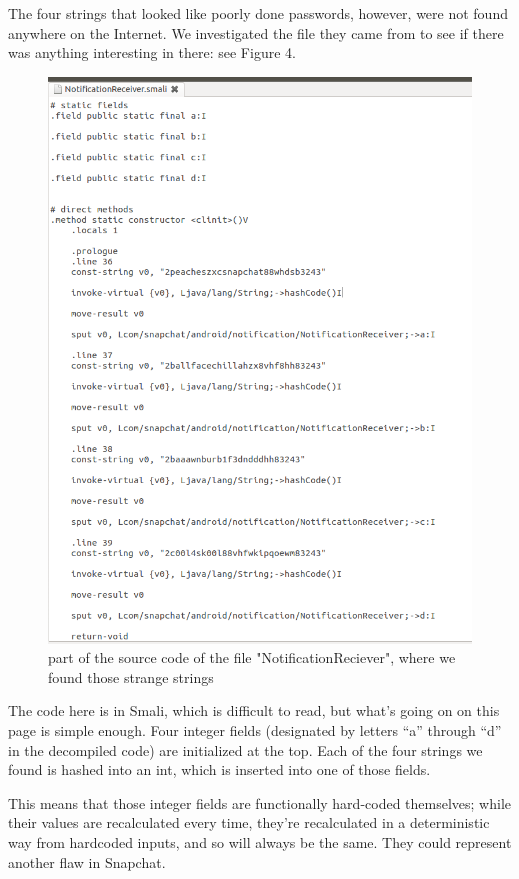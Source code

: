 \documentclass[11pt]{article}
\numberwithin{theorem}{subsection}
\begin{document}
The four strings that looked like poorly done passwords, however, were not found anywhere on the Internet.  We investigated the file
they came from to see if there was anything interesting in there: see Figure 4.

\begin{figure}[H]
  \caption{part of the source code of the file "NotificationReciever", where we found those strange strings}
  \centering
  \includegraphics[scale=0.6]{image4.png}
\end{figure}

The code here is in Smali, which is difficult to read, but what's going on on this page is simple enough.  Four integer fields (designated by
letters ``a'' through ``d'' in the decompiled code) are initialized at the top.  Each of the four strings we found is hashed into an int, which 
is inserted into one of those fields.

This means that those integer fields are functionally hard-coded themselves; while their values are recalculated every time, they're recalculated in a
deterministic way from hardcoded inputs, and so will always be the same.  They could represent another flaw in Snapchat.
\end{document}
